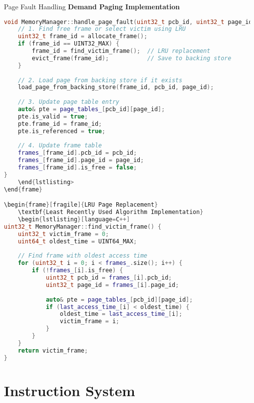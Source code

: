\documentclass[10pt]{beamer}
\begin{document}
\begin{frame}[fragile]{Page Fault Handling}
    \textbf{Demand Paging Implementation}
    \begin{lstlisting}[language=C++]
void MemoryManager::handle_page_fault(uint32_t pcb_id, uint32_t page_id) {
    // 1. Find free frame or select victim using LRU
    uint32_t frame_id = allocate_frame();
    if (frame_id == UINT32_MAX) {
        frame_id = find_victim_frame();  // LRU replacement
        evict_frame(frame_id);           // Save to backing store
    }
    
    // 2. Load page from backing store if it exists
    load_page_from_backing_store(frame_id, pcb_id, page_id);
    
    // 3. Update page table entry
    auto& pte = page_tables_[pcb_id][page_id];
    pte.is_valid = true;
    pte.frame_id = frame_id;
    pte.is_referenced = true;
    
    // 4. Update frame table
    frames_[frame_id].pcb_id = pcb_id;
    frames_[frame_id].page_id = page_id;
    frames_[frame_id].is_free = false;
}
    \end{lstlisting>
\end{frame}

\begin{frame}[fragile]{LRU Page Replacement}
    \textbf{Least Recently Used Algorithm Implementation}
    \begin{lstlisting}[language=C++]
uint32_t MemoryManager::find_victim_frame() {
    uint32_t victim_frame = 0;
    uint64_t oldest_time = UINT64_MAX;
    
    // Find frame with oldest access time
    for (uint32_t i = 0; i < frames_.size(); i++) {
        if (!frames_[i].is_free) {
            uint32_t pcb_id = frames_[i].pcb_id;
            uint32_t page_id = frames_[i].page_id;
            
            auto& pte = page_tables_[pcb_id][page_id];
            if (last_access_time_[i] < oldest_time) {
                oldest_time = last_access_time_[i];
                victim_frame = i;
            }
        }
    }
    return victim_frame;
}
    \end{lstlisting}
\end{frame}

\section{Instruction System}
\end{document}
